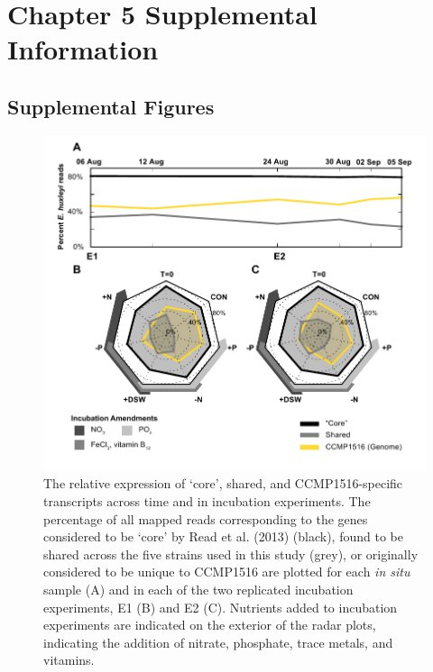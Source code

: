 \chapter{Chapter 5 Supplemental Information}
\clearpage
\section{Supplemental Figures}



\begin{figure}[h!]

  \centering
  \includegraphics[width=1\textwidth]{Images/C6_FigureS8_core_genes.pdf}
  \caption[The relative expression of `core', shared, and CCMP1516-specific transcripts across time and in incubation experiments]{The relative expression of `core', shared, and CCMP1516-specific transcripts across time and in incubation experiments. The percentage of all mapped reads corresponding to the genes considered to be `core' by Read et al. (2013) (black), found to be shared across the five strains used in this study (grey), or originally considered to be unique to CCMP1516 are plotted for each \textit{in situ} sample (A) and in each of the two replicated incubation experiments, E1 (B) and E2 (C). Nutrients added to incubation experiments are indicated on the exterior of the radar plots, indicating the addition of nitrate, phosphate, trace metals, and vitamins.}
    \label{fig:a5f8}
\end{figure}




